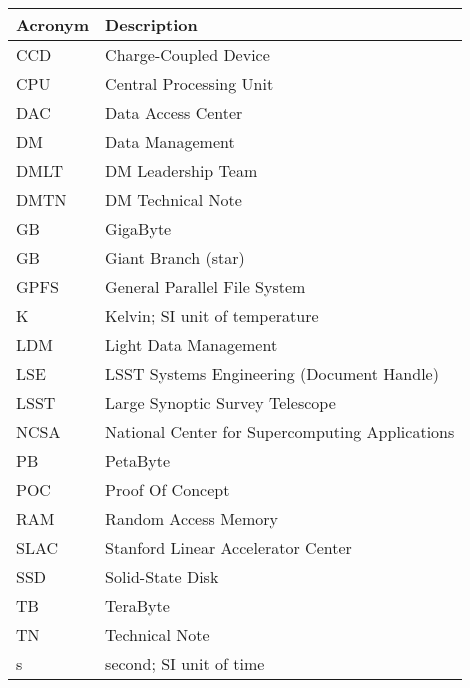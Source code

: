 \addtocounter{table}{-1}
\begin{longtable}{|l|p{}|}\hline
\textbf{Acronym} & \textbf{Description}  \\\hline

CCD&Charge-Coupled Device \\\hline
CPU&Central Processing Unit \\\hline
DAC&Data Access Center \\\hline
DM&Data Management \\\hline
DMLT&DM Leadership Team \\\hline
DMTN&DM Technical Note \\\hline
GB&GigaByte \\\hline
GB&Giant Branch (star) \\\hline
GPFS&General Parallel File System \\\hline
K&Kelvin; SI unit of temperature \\\hline
LDM&Light Data Management \\\hline
LSE&LSST Systems Engineering (Document Handle) \\\hline
LSST&Large Synoptic Survey Telescope \\\hline
NCSA&National Center for Supercomputing Applications \\\hline
PB&PetaByte \\\hline
POC&Proof Of Concept \\\hline
RAM&Random Access Memory \\\hline
SLAC&Stanford Linear Accelerator Center \\\hline
SSD&Solid-State Disk \\\hline
TB&TeraByte \\\hline
TN&Technical Note \\\hline
s&second; SI unit of time \\\hline
\end{longtable}
